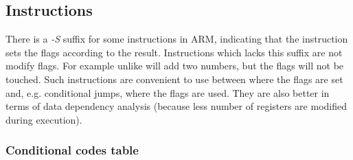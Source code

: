 \subsection{Instructions}

There is a \emph{-S} suffix for some instructions in ARM,
indicating that the instruction sets the flags according to the result.
Instructions which lacks this suffix are not modify flags.
For example  unlike 
will add two numbers, but the flags will not be touched.
Such instructions are convenient to use between \CMP where the flags are set and, 
e.g. conditional jumps, where the flags are used.
They are also better in terms of data dependency analysis 
(because less number of registers are modified during execution).



\subsubsection{Conditional codes table}


